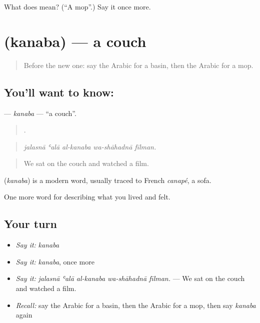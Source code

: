 \begin{tcolorbox}[breakable,colback=teal!4,colframe=teal!35!black,title={Before you move on}]
What does  mean? (\textquotedblleft{}A mop\textquotedblright{}.) Say it once more.
\end{tcolorbox}
\section[\texorpdfstring{\ar{كنبة} (kanaba)}{كنبة (kanaba)}]{ (kanaba) — a couch}

\label{lesson:AR-C551-kanaba}



\begin{quote}
Before the new one: say the Arabic for a basin, then the Arabic for a mop.
\end{quote}

\subsection*{You'll want to know: }
\textbf{} — \emph{kanaba} — \textquotedblleft{}a couch\textquotedblright{}.

\begin{quote}
    .
\end{quote}

\begin{quote}
\emph{jalasnā ʿalā al-kanaba wa-shāhadnā fīlman.}
\end{quote}

\begin{quote}
We sat on the couch and watched a film.
\end{quote}

\begin{cousinweb}
\textbf{} (\emph{kanaba}) is a modern word, usually traced to French \emph{canapé}, a sofa.
\end{cousinweb}

\begin{grammarlens}[title={What you've built}]
One more word for describing what you lived and felt.
\end{grammarlens}

\subsection*{Your turn}
\begin{itemize}
\raggedright
  \item \emph{Say it:} \emph{kanaba}
  \item \emph{Say it:} \emph{kanaba}, once more
  \item \emph{Say it:} \emph{jalasnā ʿalā al-kanaba wa-shāhadnā fīlman.} — We sat on the couch and watched a film.
  \item \emph{Recall:} say the Arabic for a basin, then the Arabic for a mop, then say \emph{kanaba} again
\end{itemize}

